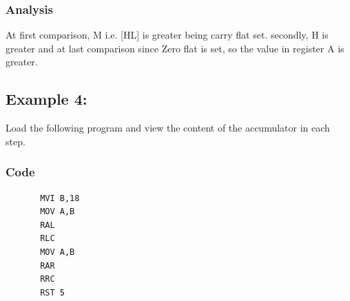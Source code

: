 \documentclass[]{report}
\begin{document}
\subsubsection {Analysis}
At first comparison, M i.e. [HL] is greater being carry flat set. secondly, H is greater and at last comparison since Zero flat is set, so the value in register  A is greater.


\vspace{10mm}
\subsection*{Example 4:}
Load the following program and view the content of the accumulator in each step.
\subsubsection{Code}
\begin{verbatim}
	   MVI B,18
	   MOV A,B
	   RAL
	   RLC
	   MOV A,B
	   RAR
	   RRC
	   RST 5
\end{verbatim}
\end{document}
